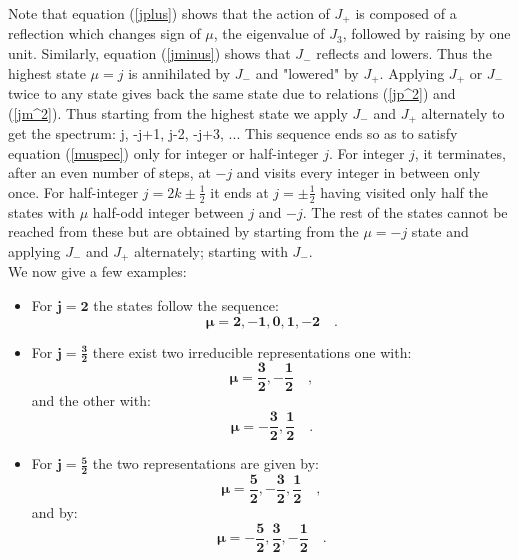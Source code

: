 Note that equation (\ref{jplus}) shows that the action of $J_+$ is
composed of a reflection which changes sign of $\mu$, the
eigenvalue of $J_3$, followed by raising by one unit. Similarly,
equation (\ref{jminus}) shows that $J_-$ reflects and lowers. Thus
the highest state $\mu = j$ is annihilated by $J_-$ and "lowered"
by $J_+$. Applying $J_+$ or $J_-$ twice to any state gives back
the same state due to relations (\ref{jp^2}) and (\ref{jm^2}).
Thus starting from the highest state we apply $J_-$ and $J_+$
alternately to get the spectrum: \beq j, -j+1, j-2, -j+3, ... \eeq
This sequence ends so as to satisfy equation (\ref{muspec}) only
for integer or half-integer $j$. For integer $j$, it terminates,
after an even number of steps, at $-j$ and visits every integer in
between only once. For half-integer $j=2k\pm\frac{1}{2}$ it ends
at $j=\pm\frac{1}{2}$ having visited only half the states with
$\mu$ half-odd integer between $j$ and $-j$. The rest of the
states cannot be reached from these but are obtained by starting
from the $\mu= -j$ state and applying $J_-$ and $J_+$ alternately;
starting with $J_-$.
\\
We now give a few examples:
\begin{itemize}
  \item
For $\mathbf{j=2}$ the states follow the sequence:
\[
\mathbf{\mu = 2, -1, 0, 1, -2}\quad.
\]
  \item
For $\mathbf{j=\frac{3}{2}}$ there exist two irreducible
representations one with:
\[
\mathbf{\mu = \frac{3}{2}, -\frac{1}{2}}\quad,
\] and the other with:
\[
\mathbf{\mu = -\frac{3}{2}, \frac{1}{2}}\quad.
\]

  \item
For $\mathbf{j=\frac{5}{2}}$ the two representations are given by:
\[
\mathbf{\mu = \frac{5}{2}, -\frac{3}{2}, \frac{1}{2}}\quad,
\] and by:
\[
\mathbf{\mu = -\frac{5}{2}, \frac{3}{2}, -\frac{1}{2}}\quad.
\]

\end{itemize}

